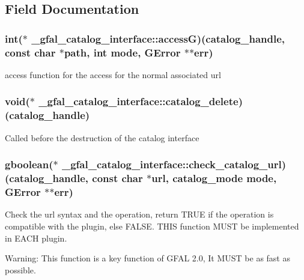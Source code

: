 \subsection{Field Documentation}
\subsubsection{\setlength{\rightskip}{0pt plus 5cm}int($\ast$ \bf{\_\-gfal\_\-catalog\_\-interface::access\-G})(catalog\_\-handle, const char $\ast$path, int mode, GError $\ast$$\ast$err)}\label{struct__gfal__catalog__interface_c4ca96a6e83a9d3e906563771bf648f1}


access function for the access for the normal associated url 
\subsubsection{\setlength{\rightskip}{0pt plus 5cm}void($\ast$ \bf{\_\-gfal\_\-catalog\_\-interface::catalog\_\-delete})(catalog\_\-handle)}\label{struct__gfal__catalog__interface_5eb6aff7c054d09bcd584dfdc8a3d88e}


Called before the destruction of the catalog interface 
\subsubsection{\setlength{\rightskip}{0pt plus 5cm}gboolean($\ast$ \bf{\_\-gfal\_\-catalog\_\-interface::check\_\-catalog\_\-url})(catalog\_\-handle, const char $\ast$url, catalog\_\-mode mode, GError $\ast$$\ast$err)}\label{struct__gfal__catalog__interface_3e21f3370e47099122b156472e25f6a7}


Check the url syntax and the operation, return TRUE if the operation is compatible with the plugin, else FALSE. THIS function MUST be implemented in EACH plugin. \begin{Desc}
\item[Warning:]This function is a key function of GFAL 2.0, It MUST be as fast as possible. \end{Desc}
